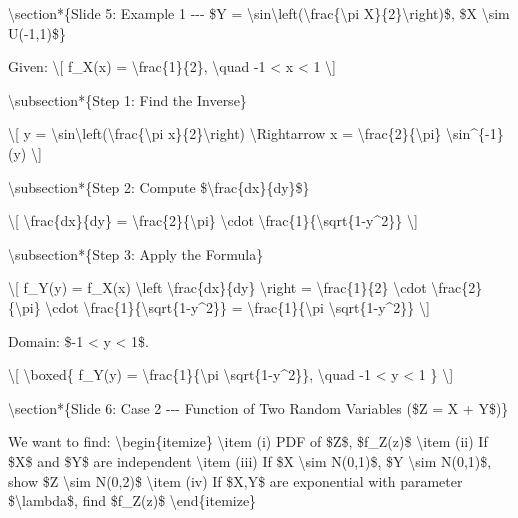 \textbackslash section*\{Slide 5: Example 1 -\/-\/- \$Y =
\textbackslash sin\textbackslash left(\textbackslash frac\{\textbackslash pi
X\}\{2\}\textbackslash right)\$, \$X \textbackslash sim U(-1,1)\$\}

Given: \textbackslash{[} f\_X(x) = \textbackslash frac\{1\}\{2\},
\textbackslash quad -1 \textless{} x \textless{} 1 \textbackslash{]}

\textbackslash subsection*\{Step 1: Find the Inverse\}

\textbackslash{[} y =
\textbackslash sin\textbackslash left(\textbackslash frac\{\textbackslash pi
x\}\{2\}\textbackslash right) \textbackslash Rightarrow x =
\textbackslash frac\{2\}\{\textbackslash pi\}
\textbackslash sin\^{}\{-1\}(y) \textbackslash{]}

\textbackslash subsection*\{Step 2: Compute
\$\textbackslash frac\{dx\}\{dy\}\$\}

\textbackslash{[} \textbackslash frac\{dx\}\{dy\} =
\textbackslash frac\{2\}\{\textbackslash pi\} \textbackslash cdot
\textbackslash frac\{1\}\{\textbackslash sqrt\{1-y\^{}2\}\}
\textbackslash{]}

\textbackslash subsection*\{Step 3: Apply the Formula\}

\textbackslash{[} f\_Y(y) = f\_X(x) \textbackslash left\textbar{}
\textbackslash frac\{dx\}\{dy\} \textbackslash right\textbar{} =
\textbackslash frac\{1\}\{2\} \textbackslash cdot
\textbackslash frac\{2\}\{\textbackslash pi\} \textbackslash cdot
\textbackslash frac\{1\}\{\textbackslash sqrt\{1-y\^{}2\}\} =
\textbackslash frac\{1\}\{\textbackslash pi
\textbackslash sqrt\{1-y\^{}2\}\} \textbackslash{]}

Domain: \$-1 \textless{} y \textless{} 1\$.

\textbackslash{[} \textbackslash boxed\{ f\_Y(y) =
\textbackslash frac\{1\}\{\textbackslash pi
\textbackslash sqrt\{1-y\^{}2\}\}, \textbackslash quad -1 \textless{} y
\textless{} 1 \} \textbackslash{]}

\textbackslash section*\{Slide 6: Case 2 -\/-\/- Function of Two Random
Variables (\$Z = X + Y\$)\}

We want to find: \textbackslash begin\{itemize\} \textbackslash item (i)
PDF of \$Z\$, \$f\_Z(z)\$ \textbackslash item (ii) If \$X\$ and \$Y\$
are independent \textbackslash item (iii) If \$X \textbackslash sim
N(0,1)\$, \$Y \textbackslash sim N(0,1)\$, show \$Z \textbackslash sim
N(0,2)\$ \textbackslash item (iv) If \$X,Y\$ are exponential with
parameter \$\textbackslash lambda\$, find \$f\_Z(z)\$
\textbackslash end\{itemize\}

